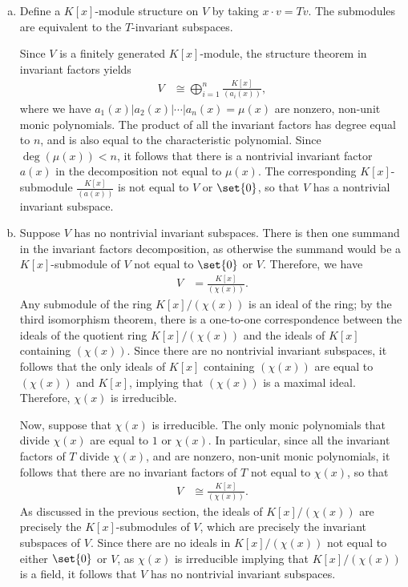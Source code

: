 \documentclass[10pt]{mypackage}
\begin{document}
\begin{solution}\hfill
  \begin{enumerate}[(a)]
    \item Define a $K[x]$-module structure on $V$ by taking $x\cdot v = Tv$. The submodules are equivalent to the $T$-invariant subspaces.

      Since $V$ is a finitely generated $K[x]$-module, the structure theorem in invariant factors yields
      \begin{align*}
        V &\cong \bigoplus_{i=1}^{n}\frac{K[x]}{\left( a_i(x) \right)},
      \end{align*}
      where we have $a_1(x) | a_2(x) | \cdots | a_n(x) = \mu(x)$ are nonzero, non-unit monic polynomials. The product of all the invariant factors has degree equal to $n$, and is also equal to the characteristic polynomial. Since $\deg\left( \mu(x) \right) < n$, it follows that there is a nontrivial invariant factor $a(x)$ in the decomposition not equal to $\mu(x)$. The corresponding $K[x]$-submodule $\frac{K[x]}{\left( a(x) \right)}$ is not equal to $V$ or $\set{0}$, so that $V$ has a nontrivial invariant subspace.
    \item Suppose $V$ has no nontrivial invariant subspaces. There is then one summand in the invariant factors decomposition, as otherwise the summand would be a $K[x]$-submodule of $V$ not equal to $\set{0}$ or $V$. Therefore, we have
      \begin{align*}
        V &= \frac{K[x]}{\left( \chi(x) \right)}.
      \end{align*}
      Any submodule of the ring $K[x]/\left( \chi(x) \right)$ is an ideal of the ring; by the third isomorphism theorem, there is a one-to-one correspondence between the ideals of the quotient ring $K[x]/\left( \chi(x) \right)$ and the ideals of $K[x]$ containing $\left( \chi(x) \right)$. Since there are no nontrivial invariant subspaces, it follows that the only ideals of $K[x]$ containing $\left( \chi(x) \right)$ are equal to $\left( \chi(x) \right)$ and $K[x]$, implying that $\left( \chi(x) \right)$ is a maximal ideal. Therefore, $\chi(x)$ is irreducible.

      Now, suppose that $\chi(x)$ is irreducible. The only monic polynomials that divide $\chi(x)$ are equal to $1$ or $\chi(x)$. In particular, since all the invariant factors of $T$ divide $\chi(x)$, and are nonzero, non-unit monic polynomials, it follows that there are no invariant factors of $T$ not equal to $\chi(x)$, so that
      \begin{align*}
        V &\cong \frac{K[x]}{\left( \chi(x) \right)}.
      \end{align*}
      As discussed in the previous section, the ideals of $K[x]/\left( \chi(x) \right)$ are precisely the $K[x]$-submodules of $V$, which are precisely the invariant subspaces of $V$. Since there are no ideals in $K[x]/\left( \chi(x) \right)$ not equal to either $\set{0}$ or $V$, as $\chi(x)$ is irreducible implying that $K[x]/\left( \chi(x) \right)$ is a field, it follows that $V$ has no nontrivial invariant subspaces.
  \end{enumerate}
\end{solution}
\end{document}
